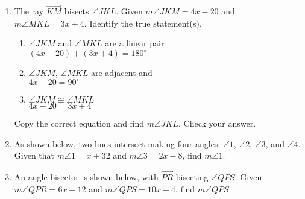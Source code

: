 \begin{enumerate}
\item The ray $\overrightarrow{KM}$ bisects $\angle JKL$. Given $m\angle JKM = 4x-20$ and \\$m\angle MKL = 3x+4$. Identify the true statement(s).
 \begin{multicols}{2}
    \begin{enumerate}
      \item $\angle JKM$ and $\angle MKL$ are a linear pair\\
      $(4x-20) + (3x+4)=180^\circ$
      \item $\angle JKM$, $\angle MKL$ are adjacent and\\
      $4x-20 =90^\circ$
      \item $\angle JKM \cong \angle MKL$\\
      $4x-20 = 3x+4$
  \end{enumerate}
  \begin{center}
  \end{center}
\end{multicols}
Copy the correct equation and find $m\angle JKL$. Check your answer. \vspace{2cm}


\item As shown below, two lines intersect making four angles: $\angle 1$, $\angle 2$, $\angle 3$, and $\angle 4$. Given that $m\angle 1= x+32$ and $m\angle 3=2x-8$, find $m\angle 1$.
  \begin{flushright}
    \end{flushright}

\item An angle bisector is shown below, with $\overrightarrow{PR}$ bisecting $\angle QPS$. Given $m\angle QPR = 6x-12$ and $m\angle QPS = 10x+4$, find $m\angle QPS$.
    \begin{flushright}
    \end{flushright}
    
\end{enumerate}
